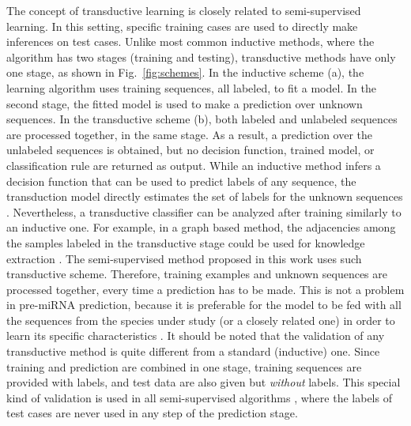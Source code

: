 \documentclass{article}
\begin{document}
The concept of transductive learning is closely related to semi-supervised learning. In this setting, specific training cases are used to directly make inferences on test cases. Unlike most common inductive methods, where the algorithm has two stages (training and testing), transductive methods have only one stage, as shown in Fig.~\ref{fig:schemes}. In the inductive scheme (a), the learning algorithm uses training sequences, all labeled, to fit a model. In the second stage, the fitted model is used to make a prediction over unknown sequences. In the transductive scheme (b), both labeled and unlabeled sequences are processed together, in the same stage. As a result, a prediction over the unlabeled sequences is obtained, but no decision function, trained model, or classification rule are returned as output. While an inductive method infers a decision function that can be used to predict labels of any sequence, the transduction model directly estimates the set of labels for the unknown sequences \citep{chapelle2006semi}.
Nevertheless, a transductive classifier can be analyzed after training similarly to an inductive one. For example, in a graph based method, the adjacencies among the samples labeled in the transductive stage could be used for knowledge extraction \citep{enright2001biolayout,novak2010graph}. The semi-supervised method proposed in this work uses such transductive scheme. Therefore, training examples and unknown sequences are processed together, every time a prediction has to be made. This is not a problem in pre-miRNA prediction, because it is preferable for the model to be fed with all the sequences from the species under study (or a closely related one) in order to learn its specific characteristics \citep{de2016automatic}.
It should be noted that the validation of any transductive method is quite different from a standard (inductive) one. Since training and prediction are combined in one stage, training sequences are provided with labels, and test data are also given but \textit{without} labels. This special kind of validation is used in all semi-supervised algorithms \citep{chapelle2006semi}, where the labels of test cases are never used in any step of the prediction stage.
\end{document}
